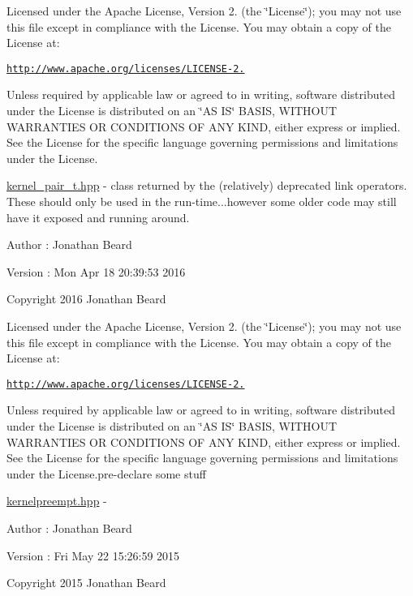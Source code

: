 Licensed under the Apache License, Version 2. (the \char`\"{}\+License\char`\"{}); you may not use this file except in compliance with the License. You may obtain a copy of the License at\+:

\href{http://www.apache.org/licenses/LICENSE-2.0}{\tt http\+://www.\+apache.\+org/licenses/\+L\+I\+C\+E\+N\+S\+E-\/2.}

Unless required by applicable law or agreed to in writing, software distributed under the License is distributed on an \char`\"{}\+A\+S I\+S\char`\"{} B\+A\+S\+IS, W\+I\+T\+H\+O\+UT W\+A\+R\+R\+A\+N\+T\+I\+ES OR C\+O\+N\+D\+I\+T\+I\+O\+NS OF A\+NY K\+I\+ND, either express or implied. See the License for the specific language governing permissions and limitations under the License.

\hyperlink{kernel__pair__t_8hpp_source}{kernel\+\_\+pair\+\_\+t.\+hpp} -\/ class returned by the (relatively) deprecated link operators. These should only be used in the run-\/time...however some older code may still have it exposed and running around.

\begin{DoxyAuthor}{Author}
\+: Jonathan Beard 
\end{DoxyAuthor}
\begin{DoxyVersion}{Version}
\+: Mon Apr 18 20\+:39\+:53 2016
\end{DoxyVersion}
Copyright 2016 Jonathan Beard

Licensed under the Apache License, Version 2. (the \char`\"{}\+License\char`\"{}); you may not use this file except in compliance with the License. You may obtain a copy of the License at\+:

\href{http://www.apache.org/licenses/LICENSE-2.0}{\tt http\+://www.\+apache.\+org/licenses/\+L\+I\+C\+E\+N\+S\+E-\/2.}

Unless required by applicable law or agreed to in writing, software distributed under the License is distributed on an \char`\"{}\+A\+S I\+S\char`\"{} B\+A\+S\+IS, W\+I\+T\+H\+O\+UT W\+A\+R\+R\+A\+N\+T\+I\+ES OR C\+O\+N\+D\+I\+T\+I\+O\+NS OF A\+NY K\+I\+ND, either express or implied. See the License for the specific language governing permissions and limitations under the License.\+pre-\/declare some stuff

\hyperlink{kernelpreempt_8hpp_source}{kernelpreempt.\+hpp} -\/ \begin{DoxyAuthor}{Author}
\+: Jonathan Beard 
\end{DoxyAuthor}
\begin{DoxyVersion}{Version}
\+: Fri May 22 15\+:26\+:59 2015
\end{DoxyVersion}
Copyright 2015 Jonathan Beard


